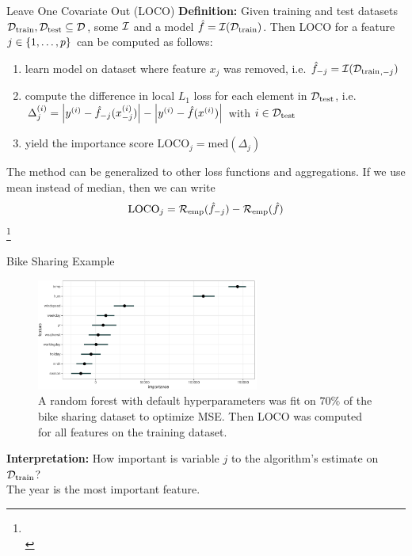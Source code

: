 \documentclass[11pt,compress,t,notes=noshow, xcolor=table]{beamer}
\begin{document}
\begin{vbframe}{Leave One Covariate Out (LOCO)}
%
\textbf{Definition:} Given training and test datasets $\Dtrain, \Dtest \subseteq \D$, some $\inducer$ and a model $\fh = \inducer(\Dtrain)$. Then LOCO for a feature $j \in \pset$ can be computed as follows:
  \begin{enumerate}
    \item learn model on dataset where feature $x_j$ was removed, i.e. $\fh_{-j} = \inducer({\Dtrain}_{,-j})$
    \item compute the difference in local $L_1$ loss for each element in $\Dtest$, i.e. $\Delta_j^{(i)} = \left  |y^{(i)} - \fh_{-j}(x_{-j}^{(i)}) \right | - \left |y^{(i)} - \fh(x^{(i)}) \right | $ with $i \in \Dtest$
    \item yield the importance score $\text{LOCO}_j = \text{med} \left ( \Delta_j  \right )$
  \end{enumerate}
\lz 
The method can be generalized to other loss functions and aggregations. If we use mean instead of median, then we can write
%
$$ \text{LOCO}_j = \riske(\fh_{-j}) - \riske(\fh) $$
\footnote[frame]{\\ }
\end{vbframe}

\begin{vbframe}{Bike Sharing Example}
%
\begin{figure}
  \centering
  \includegraphics[width=0.65\textwidth]{figure_man/bike_sharing_loco.pdf}
\caption{A random forest with default hyperparameters was fit on $70\%$ of the bike sharing dataset to optimize MSE. Then LOCO was computed for all features on the training dataset.}
\end{figure}
%
 \textbf{Interpretation:} How important is variable $j$ to the algorithm's estimate on $\Dtrain$?\\
The year is the most important feature.\\
%
\end{vbframe}
\end{document}
